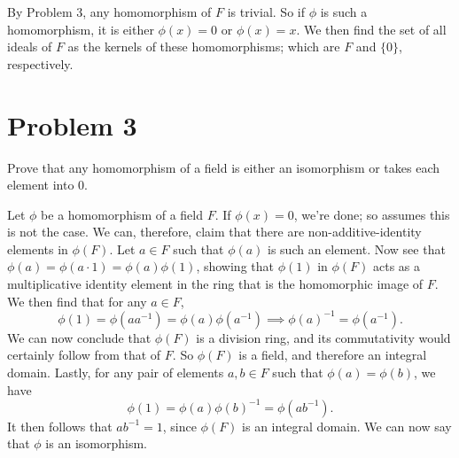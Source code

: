 \documentclass[12pt]{article}
\begin{document}
By Problem 3, any homomorphism of $F$ is trivial.  So if $\phi$ is
such a homomorphism, it is either $\phi(x)=0$ or $\phi(x)=x$.
We then find the set of all ideals of $F$ as the kernels of these homomorphisms; which
are $F$ and $\{0\}$, respectively.

\section*{Problem 3}

Prove that any homomorphism of a field is either an isomorphism or takes each element into $0$.

Let $\phi$ be a homomorphism of a field $F$.  If $\phi(x)=0$, we're done; so assumes this is not the case.
We can, therefore, claim that there are non-additive-identity elements in $\phi(F)$.  Let $a\in F$ such
that $\phi(a)$ is such an element.  Now see that $\phi(a)=\phi(a\cdot 1)=\phi(a)\phi(1)$, showing that
$\phi(1)$ in $\phi(F)$ acts as a multiplicative identity element in the ring that is the homomorphic image of $F$.
We then find that for any $a\in F$,
\begin{equation*}
\phi(1)=\phi(aa^{-1})=\phi(a)\phi(a^{-1})\implies\phi(a)^{-1}=\phi(a^{-1}).
\end{equation*}
We can now conclude that $\phi(F)$ is a division ring, and its commutativity would certainly
follow from that of $F$.  So $\phi(F)$ is a field, and therefore an integral domain.
Lastly, for any pair of elements $a,b\in F$ such that $\phi(a)=\phi(b)$,
we have
\begin{equation*}
\phi(1)=\phi(a)\phi(b)^{-1}=\phi(ab^{-1}).
\end{equation*}
It then follows that $ab^{-1}=1$, since $\phi(F)$ is an integral domain.
We can now say that $\phi$ is an isomorphism.
\end{document}
